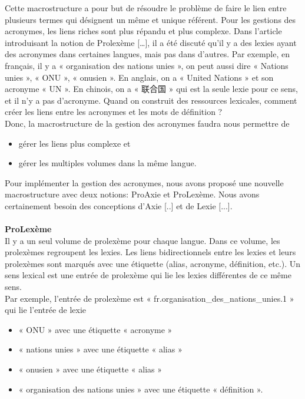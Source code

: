 \documentclass[10pt,a4paper,twoside]{article}
\begin{document}
Cette macrostructure a pour but de résoudre le problème de faire le lien entre plusieurs termes qui désignent un même et unique référent. Pour les gestions des acronymes, les liens riches sont plus répandu et plus complexe. Dans l'article introduisant la notion de Prolexème […], il a été discuté qu’il y a des lexies ayant des acronymes dans certaines langues, mais pas dans d'autres. Par exemple, en français, il y a « organisation des nations unies »\footnotemark[1], on peut aussi dire « Nations unies », « ONU », « onusien ». En anglais, on a « United Nations » et son acronyme « UN ». En chinois, on a « 联合国 » qui est la seule lexie pour ce sens, et il n’y a pas d’acronyme. Quand on construit des ressources lexicales, comment créer les liens entre les acronymes et les mots de définition ? \\
Donc, la macrostructure de la gestion des acronymes faudra nous permettre de 
\begin{itemize}
\begin{itemize}
\item gérer les liens  plus complexe et
\item gérer les multiples volumes dans la même langue. 
\end{itemize}
\end{itemize}
Pour implémenter la gestion des acronymes, nous avons proposé une nouvelle macrostructure avec deux notions: ProAxie et ProLexème. Nous avons certainement besoin des conceptions d’Axie [..] et de Lexie [...]. \\
\\
\textbf{ProLexème}\\
Il y a un seul volume de prolexème pour chaque langue. Dans ce volume, les prolexèmes regroupent les lexies. Les liens bidirectionnels entre les lexies et leurs prolexèmes sont marqués avec une étiquette (alias, acronyme, définition, etc.). Un sens lexical est une entrée de prolexème qui lie les lexies différentes de ce même sens. \\
Par exemple, l’entrée de prolexème est « fr.organisation\_des\_nations\_unies.1 » qui lie l’entrée de lexie 
\begin{itemize}
\begin{itemize}
\item « ONU » avec une étiquette « acronyme »
\item « nations unies » avec une étiquette « alias »
\item « onusien » avec une étiquette « alias »
\item « organisation des nations unies » avec une étiquette « définition ».
\end{itemize}
\end{itemize}
\end{document}
